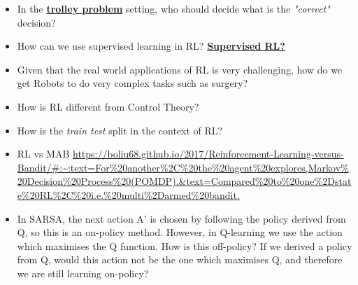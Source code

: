 \documentclass[paper=a4, fontsize=11pt,twoside]{scrartcl}	%
\begin{document}
\begin{itemize}
    \item {In the \href{https://en.wikipedia.org/wiki/Trolley_problem}{\textbf{trolley problem}} setting, who should decide what is the \textit{"correct"} decision?}
    \item {How can we use supervised learning in RL? \href{https://bair.berkeley.edu/blog/2020/10/13/supervised-rl/}{\textbf{Supervised RL?}}}
    \item{Given that the real world applications of RL is very challenging, how do we get Robots to do very complex tasks such as surgery?}
    \item How is RL different from Control Theory?
    \item {How is the \textit{train test} split in the context of RL?}
    \item{RL vs MAB \url{https://boliu68.github.io/2017/Reinforcement-Learning-versus-Bandit/#:~:text=For%20another%2C%20the%20agent%20explores,Markov%20Decision%20Process%20(POMDP).&text=Compared%20to%20one%2Dstate%20RL%2C%20i.e.%20multi%2Darmed%20bandit.}
    }
    \item{In SARSA, the next action A' is chosen by following the policy derived from Q, so this is an on-policy method. However, in Q-learning we use the action which maximises the Q function. How is this off-policy? If we derived a policy from Q, would this action not be the one which maximises Q, and therefore we are still learning on-policy?}
\end{itemize}
\end{document}
